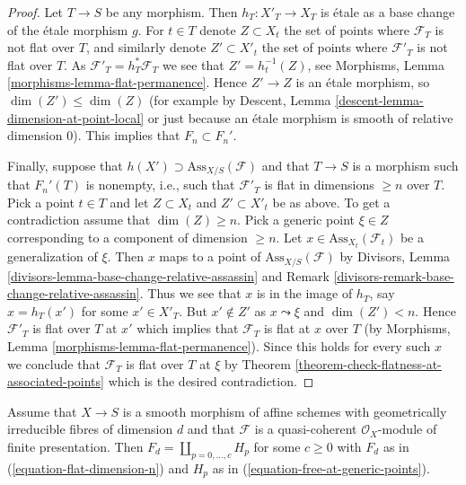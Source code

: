 \begin{proof}
Let $T \to S$ be any morphism. Then $h_T : X'_T \to X_T$ is \'etale as a
base change of the \'etale morphism $g$. For $t \in T$ denote
$Z \subset X_t$ the set of points where $\mathcal{F}_T$ is not
flat over $T$, and similarly denote $Z' \subset X'_t$ the set of
points where $\mathcal{F}'_T$ is not flat over $T$. As
$\mathcal{F}'_T = h_T^*\mathcal{F}_T$ we see that
$Z' = h_t^{-1}(Z)$, see
Morphisms, Lemma \ref{morphisms-lemma-flat-permanence}.
Hence $Z' \to Z$ is an \'etale morphism, so $\dim(Z') \leq \dim(Z)$
(for example by
Descent, Lemma \ref{descent-lemma-dimension-at-point-local}
or just because an \'etale morphism is smooth of relative dimension $0$).
This implies that $F_n \subset F_n'$.

\medskip\noindent
Finally, suppose that $h(X') \supset \text{Ass}_{X/S}(\mathcal{F})$
and that $T \to S$ is a morphism such that $F_n'(T)$ is nonempty, i.e.,
such that $\mathcal{F}'_T$ is flat in dimensions $\geq n$ over $T$.
Pick a point $t \in T$ and let $Z \subset X_t$ and $Z' \subset X'_t$
be as above. To get a contradiction assume that $\dim(Z) \geq n$.
Pick a generic point $\xi \in Z$ corresponding to a component
of dimension $\geq n$. Let $x \in \text{Ass}_{X_t}(\mathcal{F}_t)$
be a generalization of $\xi$. Then $x$ maps to a point of
$\text{Ass}_{X/S}(\mathcal{F})$ by
Divisors, Lemma \ref{divisors-lemma-base-change-relative-assassin} and
Remark \ref{divisors-remark-base-change-relative-assassin}.
Thus we see that $x$ is in the image of $h_T$, say
$x = h_T(x')$ for some $x' \in X'_T$. But $x' \not \in Z'$
as $x \leadsto \xi$ and $\dim(Z') < n$. Hence $\mathcal{F}'_T$
is flat over $T$ at $x'$ which implies that $\mathcal{F}_T$ is flat
at $x$ over $T$ (by
Morphisms, Lemma \ref{morphisms-lemma-flat-permanence}).
Since this holds for every such $x$ we conclude
that $\mathcal{F}_T$ is flat over $T$ at $\xi$ by
Theorem \ref{theorem-check-flatness-at-associated-points}
which is the desired contradiction.
\end{proof}

\begin{lemma}
\label{lemma-compare-H-F}
Assume that $X \to S$ is a smooth morphism of affine schemes
with geometrically irreducible fibres of dimension $d$ and that
$\mathcal{F}$ is a quasi-coherent $\mathcal{O}_X$-module of finite
presentation. Then $F_d = \coprod_{p = 0, \ldots, c} H_p$
for some $c \geq 0$ with $F_d$ as in
(\ref{equation-flat-dimension-n}) and $H_p$ as in
(\ref{equation-free-at-generic-points}).
\end{lemma}


